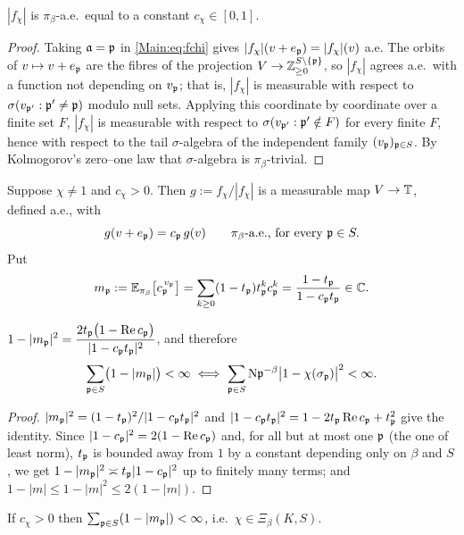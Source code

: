 \begin{lemma}\label{Main:lem:01}
$|f_\chi|$ is $\pi_\beta$-a.e.\ equal to a constant $c_\chi\in[0,1]$.
\end{lemma}

\begin{proof}
Taking $\mathfrak{a}=\mathfrak{p}$ in \eqref{Main:eq:fchi} gives $|f_\chi|(v+e_{\mathfrak{p}})=|f_\chi|(v)$
a.e. The orbits of $v\mapsto v+e_{\mathfrak{p}}$ are the fibres of the projection
$V\to\mathbb{Z}_{\ge0}^{S\setminus\{\mathfrak{p}\}}$, so $|f_\chi|$ agrees a.e.\ with a function
not depending on $v_{\mathfrak{p}}$; that is, $|f_\chi|$ is measurable with respect to
$\sigma(v_{\mathfrak{p}'}:\mathfrak{p}'\neq\mathfrak{p})$ modulo null sets. Applying this coordinate by
coordinate over a finite set $F$, $|f_\chi|$ is measurable with respect to
$\sigma(v_{\mathfrak{p}'}:\mathfrak{p}'\notin F)$ for every finite $F$, hence with respect to the
tail $\sigma$-algebra of the independent family $(v_{\mathfrak{p}})_{\mathfrak{p}\in S}$. By
Kolmogorov's zero--one law that $\sigma$-algebra is $\pi_\beta$-trivial.
\end{proof}

Suppose $\chi\neq1$ and $c_\chi>0$. Then $g:=f_\chi/|f_\chi|$ is a measurable
map $V\to\mathbb{T}$, defined a.e., with
\begin{equation}\label{Main:eq:cob}
g(v+e_{\mathfrak{p}})=c_{\mathfrak{p}}\,g(v)\qquad\pi_\beta\text{-a.e., for every }\mathfrak{p}\in S .
\end{equation}
Put
\[
m_{\mathfrak{p}}:=\mathbb E_{\pi_\beta}\bigl[c_{\mathfrak{p}}^{\,v_{\mathfrak{p}}}\bigr]=\sum_{k\ge0}(1-t_{\mathfrak{p}})t_{\mathfrak{p}}^k c_{\mathfrak{p}}^k=\frac{1-t_{\mathfrak{p}}}{1-c_{\mathfrak{p}} t_{\mathfrak{p}}}\in\mathbb{C} .
\]

\begin{lemma}\label{Main:lem:mp}
$\displaystyle 1-|m_{\mathfrak{p}}|^2=\frac{2t_{\mathfrak{p}}\bigl(1-\operatorname{Re}c_{\mathfrak{p}}\bigr)}{|1-c_{\mathfrak{p}} t_{\mathfrak{p}}|^2}$,
and therefore
\[
\sum_{\mathfrak{p}\in S}\bigl(1-|m_{\mathfrak{p}}|\bigr)<\infty
\iff
\sum_{\mathfrak{p}\in S}\mathrm{N}\mathfrak{p}^{-\beta}\bigl|1-\chi(\sigma_{\mathfrak{p}})\bigr|^2<\infty .
\]
\end{lemma}

\begin{proof}
$|m_{\mathfrak{p}}|^2=(1-t_{\mathfrak{p}})^2/|1-c_{\mathfrak{p}} t_{\mathfrak{p}}|^2$ and
$|1-c_{\mathfrak{p}} t_{\mathfrak{p}}|^2=1-2t_{\mathfrak{p}}\operatorname{Re}c_{\mathfrak{p}}+t_{\mathfrak{p}}^2$ give the identity.
Since $|1-c_{\mathfrak{p}}|^2=2(1-\operatorname{Re}c_{\mathfrak{p}})$ and, for all but at most one
$\mathfrak{p}$ (the one of least norm), $t_{\mathfrak{p}}$ is bounded away from $1$ by a constant
depending only on $\beta$ and $S$, we get $1-|m_{\mathfrak{p}}|^2\asymp t_{\mathfrak{p}}|1-c_{\mathfrak{p}}|^2$
up to finitely many terms; and $1-|m|\le1-|m|^2\le2(1-|m|)$.
\end{proof}

\begin{proposition}[Necessity]\label{Main:prop:nec}
If $c_\chi>0$ then $\sum_{\mathfrak{p}\in S}(1-|m_{\mathfrak{p}}|)<\infty$, i.e.\
$\chi\in\Xi_\beta(K,S)$.
\end{proposition}

